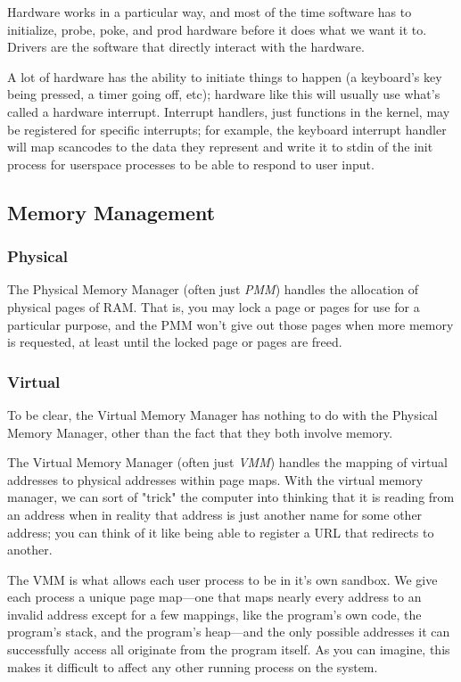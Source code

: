 \documentclass[onepage=true]{article}
\begin{document}
Hardware works in a particular way, and most of the time software has to initialize, probe, poke, and prod hardware before it does what we want it to. Drivers are the software that directly interact with the hardware.

A lot of hardware has the ability to initiate things to happen (a keyboard's key being pressed, a timer going off, etc); hardware like this will usually use what's called a hardware interrupt. Interrupt handlers, just functions in the kernel, may be registered for specific interrupts; for example, the keyboard interrupt handler will map scancodes to the data they represent and write it to stdin of the init process for userspace processes to be able to respond to user input.

\subsection{Memory Management}

\subsubsection{Physical}
The Physical Memory Manager (often just \emph{PMM}) handles the allocation of physical pages of RAM. That is, you may lock a page or pages for use for a particular purpose, and the PMM won't give out those pages when more memory is requested, at least until the locked page or pages are freed.

\subsubsection{Virtual}
To be clear, the Virtual Memory Manager has nothing to do with the Physical Memory Manager, other than the fact that they both involve memory.

The Virtual Memory Manager (often just \emph{VMM}) handles the mapping of virtual addresses to physical addresses within page maps. With the virtual memory manager, we can sort of "trick" the computer into thinking that it is reading from an address when in reality that address is just another name for some other address; you can think of it like being able to register a URL that redirects to another.

The VMM is what allows each user process to be in it's own sandbox. We give each process a unique page map---one that maps nearly every address to an invalid address except for a few mappings, like the program's own code, the program's stack, and the program's heap---and the only possible addresses it can successfully access all originate from the program itself. As you can imagine, this makes it difficult to affect any other running process on the system.
\end{document}
